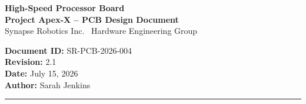 \documentclass[11pt,a4paper]{article}
\begin{document}
\begin{center}
    \begin{minipage}{0.65\textwidth}
        {\Huge\bfseries\color{primary} High-Speed Processor Board}\\
        \vspace{0.2cm}
        {\large\bfseries\color{secondary} Project Apex-X -- PCB Design Document}\\
        \vspace{0.1cm}
        {\color{darktext}\small Synapse Robotics Inc. \textbar\ Hardware Engineering Group}
    \end{minipage}
    \hfill
    \begin{minipage}{0.3\textwidth}
        \begin{flushright}
            \color{darktext}\small
            \textbf{Document ID:} SR-PCB-2026-004\\
            \textbf{Revision:} 2.1\\
            \textbf{Date:} July 15, 2026\\
            \textbf{Author:} Sarah Jenkins
        \end{flushright}
    \end{minipage}
\end{center}
\vspace{0.2cm}
{\color{primary}\rule{\textwidth}{1.5pt}}
\vspace{0.4cm}








\end{document}
